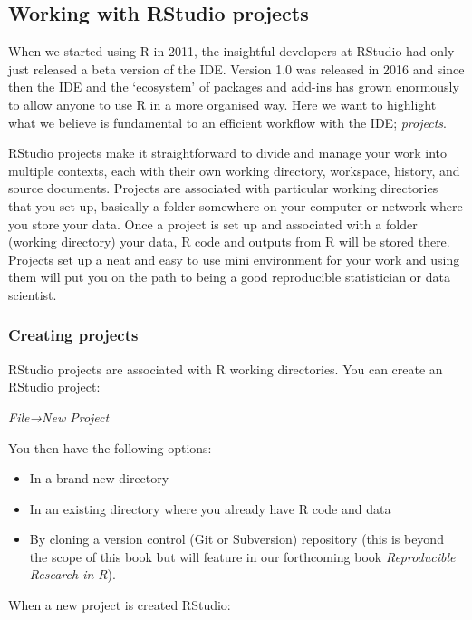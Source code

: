 \documentclass[
]{book}
\providecommand{\tightlist}{%
  \setlength{\itemsep}{0pt}\setlength{\parskip}{0pt}}
\begin{document}
\hypertarget{RS-projects}{%
\subsection{Working with RStudio projects}\label{RS-projects}}

When we started using R in 2011, the insightful developers at RStudio
had only just released a beta version of the IDE. Version 1.0 was
released in 2016 and since then the IDE and the `ecosystem' of packages
and add-ins has grown enormously to allow anyone to use R in a more
organised way. Here we want to highlight what we believe is fundamental
to an efficient workflow with the IDE; \emph{projects}.

RStudio projects make it straightforward to divide and manage your work
into multiple contexts, each with their own working directory,
workspace, history, and source documents. Projects are associated with
particular working directories that you set up, basically a folder
somewhere on your computer or network where you store your data. Once a
project is set up and associated with a folder (working directory) your
data, R code and outputs from R will be stored there. Projects set up a
neat and easy to use mini environment for your work and using them will
put you on the path to being a good reproducible statistician or data
scientist.

\hypertarget{create-proj}{%
\subsubsection{Creating projects}\label{create-proj}}

RStudio projects are associated with R working directories. You can
create an RStudio project:

\emph{File→New Project}

You then have the following options:

\begin{itemize}
\tightlist
\item
  In a brand new directory
\item
  In an existing directory where you already have R code and data
\item
  By cloning a version control (Git or Subversion) repository (this is
  beyond the scope of this book but will feature in our forthcoming book
  \emph{Reproducible Research in R}).
\end{itemize}

When a new project is created RStudio:
\end{document}
